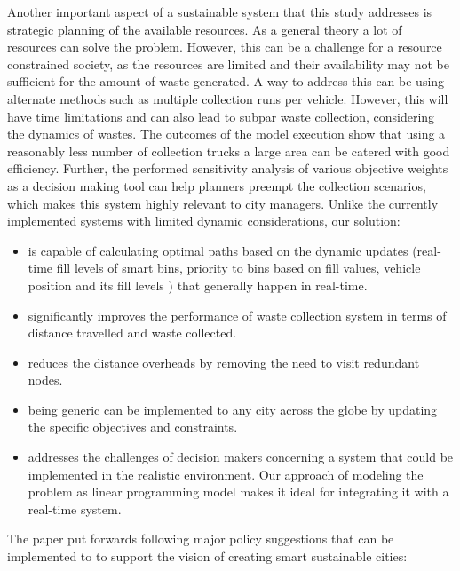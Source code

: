 \documentclass[12pt]{article}
\begin{document}
Another important aspect of a sustainable system that this study addresses is strategic planning of the available resources. As a general theory a lot of resources can solve the problem. However, this can be a challenge for a resource constrained society, as the resources are limited and their availability may not be sufficient for the amount of waste generated. A way to address this can be using alternate methods such as multiple collection runs per vehicle. However, this will have time limitations and can also lead to subpar waste collection, considering the dynamics of wastes. The outcomes of the model execution show that using a reasonably less number of collection trucks a large area can be catered with good efficiency. Further, the performed sensitivity analysis of various objective weights as a decision making tool can help planners preempt the collection scenarios, which makes this system highly relevant to city managers.
Unlike the currently implemented systems with limited dynamic considerations, our solution:
\begin{itemize}
   
    \item is capable of calculating optimal paths based on the dynamic updates (real-time fill levels of smart bins, priority to bins based on fill values, vehicle position and its fill levels ) that generally happen in real-time.
    \item significantly improves the performance of waste collection system in terms of distance travelled and waste collected.
    \item reduces the distance overheads by removing the need to visit redundant nodes.
    \item being generic can be implemented to any city across the globe by updating the specific objectives and constraints. 
    
    \item addresses the challenges of decision makers concerning a system that could be implemented in the realistic environment. Our approach of modeling the problem as linear programming model makes it ideal for integrating it with a real-time system. 

\end{itemize}

The paper put forwards following major policy suggestions that can be implemented to to support the vision of creating smart sustainable cities:
\end{document}

